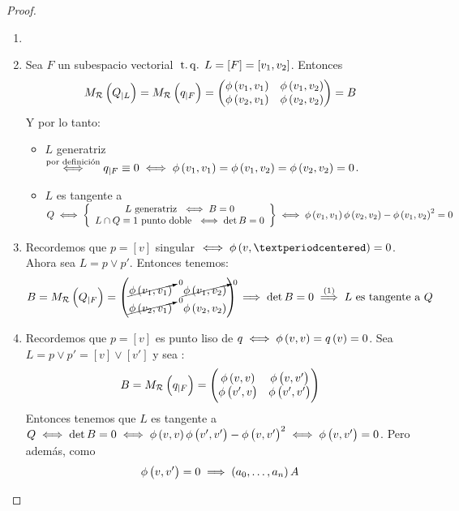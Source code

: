 \begin{proof}
 \begin{enumerate}[(1)]
  \item[]
  \item Sea $F$ un subespacio vectorial $\operatorname{\;t.q.\;} L=[F]=[v_1,v_2]$. Entonces
  \[
   M_{\mathcal{R}} \left( Q_{|L} \right) = M_{\mathcal{R}} \left( q_{|F}\right) =
   \begin{pmatrix}
    \phi\left( v_1,v_1\right) & \phi\left( v_1,v_2\right)\\
    \phi\left( v_2,v_1\right) & \phi\left( v_2,v_2\right)\\
   \end{pmatrix} =B
  \]
  Y por lo tanto:
  \begin{itemize}
   \item $L$ generatriz $\stackrel{\text{por definición}}{\iff} q_{|F}\equiv 0
   \iff \phi\left( v_1,v_1\right) = \phi\left( v_1,v_2\right) = \phi\left( v_2,v_2\right)=0$.
   \item $L$ es tangente a $Q \iff \left\{
   \begin{array}{c}
    L \text{ generatriz }  \iff B=0 \\
    L\cap Q \equiv 1 \text{ punto doble }  \iff \det B=0\\
   \end{array}\right\} \iff \phi\left( v_1,v_1\right) \phi\left( v_2,v_2\right) - \phi\left( v_1,v_2\right) ^2 =0$
  \end{itemize}
  \item Recordemos que $p=[v]$ singular $\iff \phi\lp v,·\rp=0$. Ahora sea $L=p\vee p'$.
  Entonces tenemos:
  \[
   B=M_{\mathcal{R}}\left( Q_{|F}\right) = 
   \begin{pmatrix}
    \cancelto{0}{\phi\left( v_1,v_1\right)} & \cancelto{0}{\phi\left( v_1,v_2\right)}\\
    \cancelto{0}{\phi\left( v_2,v_1\right)} & \phi\left( v_2,v_2\right)
   \end{pmatrix} \implies \det B=0 \stackrel{(1)}{\implies} L \text{ es tangente a } Q
  \]
  \item Recordemos que $p=[v]$ es punto liso de $q \iff \phi\left( v,v\right) = q\left( v\right) =0$.
  Sea $L=p\vee p' = [v]\vee [v']$ y sea :
  \[
   B=M_{\mathcal{R}} \left( q_{|F}\right) = 
   \begin{pmatrix}
    \phi\left( v,v\right) & \phi\left( v,v'\right)\\
    \phi\left( v',v\right) & \phi\left( v',v'\right)\\
   \end{pmatrix}
  \]
  Entonces tenemos que $L$ es tangente a $Q \iff \det B =0 \iff \phi\left( v,v\right)\phi\left( v',v'\right)
  - \phi\left( v,v'\right)^2 \iff \phi \left( v,v'\right) =0$. Pero además, como
  \[
   \phi\left( v,v'\right) =0\implies \left( a_0, \dots ,a_n \right) A 
\]
\end{enumerate}
\end{proof}
